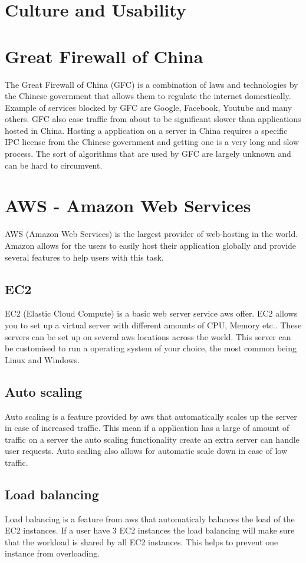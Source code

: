 \section{Culture and Usability}

\section{Great Firewall of China}
The Great Firewall of China (GFC) is a combination of laws and technologies by the Chinese government that allows them to regulate the internet domestically. Example of services blocked by GFC are Google, Facebook, Youtube and many others. GFC also case traffic from about to be significant slower than applications hosted in China. Hosting a application on a server in China requires a specific IPC license from the Chinese government and getting one is a very long and slow process. The sort of algorithms that are used by GFC are largely unknown and can be hard to circumvent.

\section{AWS - Amazon Web Services}
AWS (Amazon Web Services) is the largest provider of web-hosting in the world. Amazon allows for the users to easily host their application globally and provide several features to help users with this task.
\subsection{EC2}
EC2 (Elastic Cloud Compute) is a basic web server service aws offer. EC2 allows you to set up a virtual server with different amounts of CPU, Memory etc.. These servers can be set up on several aws locations across the world. This server can be customised to run a operating system of your choice, the most common being Linux and Windows.
\subsection{Auto scaling}
Auto scaling is a feature provided by aws that automatically scales up the server in case of increased traffic. This mean if a application has a large of amount of traffic on a server the auto scaling functionality create an extra server can handle user requests. Auto scaling also allows for automatic scale down in case of low traffic. 
\subsection{Load balancing}
Load balancing is a feature from aws that automaticaly balances the load of the EC2 instances. If a user have 3 EC2 instances the load balancing will make sure that the workload is shared by all EC2 instances. This helps to prevent one instance from overloading.
